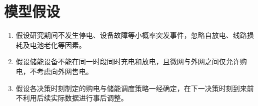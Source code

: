 \section{模型假设}
\begin{enumerate}[label=\arabic*.]
  \item 假设研究期间不发生停电、设备故障等小概率突发事件，忽略自放电、线路损耗及电池老化等因素。
  \item 假设储能设备不能在同一时段同时充电和放电，且微网与外网之间仅允许购电，不考虑向外网售电。
  \item 假设各决策时刻制定的购电与储能调度策略一经确定，在下一决策时刻到来前不利用后续实际数据进行事后调整。
\end{enumerate}

